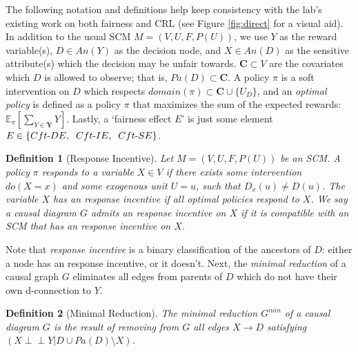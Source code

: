 \documentclass[letterpaper,10pt]{article}
\newtheorem{definition}{Definition}
\newcommand\indep{\perp \!\!\! \perp}
\begin{document}
The following notation and definitions help keep consistency with the lab's existing work on both fairness\cite{r30} and CRL \cite{r57} (see Figure \ref{fig:direct} for a visual aid). In addition to the usual SCM $M=(V,U,F,P(U))$, we use $Y$ as the reward variable(s), $D\in An(Y)$ as the decision node, and $X\in An(D)$ as the sensitive attribute(s) which the decision may be unfair towards. $\mathbf{C}\subset V$ are the covariates which $D$ is allowed to observe; that is, $Pa(D)\subset \mathbf{C}$. A policy $\pi$ is a soft intervention on $D$ which respects $domain(\pi)\subset \mathbf{C}\cup \{U_D\}$, and an \emph{optimal policy} is defined as a policy $\pi$ that maximizes the sum of the expected rewards: $\mathbb{E}_\pi [\sum_{Y\in\mathbf{Y}}Y]$.
Lastly, a `fairness effect $E$' is just some element $E\in\{Cft{\text -}DE,\hspace{2mm} Cft{\text -}IE,\hspace{2mm} Cft{\text -}SE\}$.

\begin{definition}[Response Incentive]
Let $M=(V,U,F,P(U))$ be an SCM. A policy $\pi$ responds to a variable $X\in V$ if there exists some intervention $do(X=x)$ and some exogenous unit $U=u$, such that $D_x(u) \neq D(u)$. The variable $X$ has an \emph{response incentive} if all optimal policies respond to $X$.
We say a causal diagram $G$ \emph{admits} an response incentive on $X$ if it is compatible with an SCM that has an response incentive on $X$.
\end{definition}


Note that \emph{response incentive} is a binary classification of the ancestors of $D$: either a node has an response incentive, or it doesn't.
Next, the \emph{minimal reduction} of a causal graph $G$ eliminates all edges from parents of $D$ which do not have their own d-connection to $Y$.

\begin{definition}[Minimal Reduction]
The \emph{minimal reduction} $G^{min}$ of a causal diagram $G$ is the result of removing from $G$ all edges $X\rightarrow D$ satisfying $(X\indep Y | D \cup Pa(D) \setminus X)$.
\end{definition}
\end{document}
